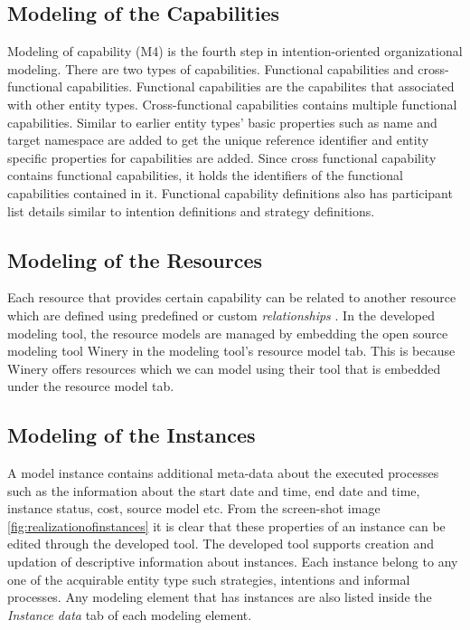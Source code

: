 \subsection{Modeling of the Capabilities}
Modeling of capability (M4) is the fourth step in intention-oriented organizational modeling. There are two types of capabilities. Functional capabilities and cross-functional capabilities. Functional capabilities are the capabilites that associated with other entity types. Cross-functional capabilities contains multiple functional capabilities. Similar to earlier entity types' basic properties such as name and target namespace are added to get the unique reference identifier and entity specific properties for capabilities are added. Since cross functional capability contains functional capabilities, it holds the identifiers of the functional capabilities contained in it. Functional capability definitions also has participant list details similar to intention definitions and strategy definitions. 

\subsection{Modeling of the Resources}
Each resource that provides certain capability can be related to another resource which are defined using predefined or custom \textit{relationships} \cite{Sungur2014a}. In the developed modeling tool, the resource models are managed by embedding the open source modeling tool Winery \cite{Kopp2013} in the modeling tool's resource model tab. This is because Winery offers resources which we can model using their tool that is embedded under the resource model tab.

\subsection{Modeling of the Instances}
 A model instance contains additional meta-data about the executed processes such as the information about the start date and time, end date and time, instance status, cost, source model etc. From the screen-shot image \ref{fig:realizationofinstances} it is clear that these properties of an instance can be edited through the developed tool. The developed tool supports creation and updation of descriptive information about instances. Each instance belong to any one of the acquirable entity type such strategies, intentions and informal processes. Any modeling element that has instances are also listed inside the \textit{Instance data} tab of each modeling element.  
 
